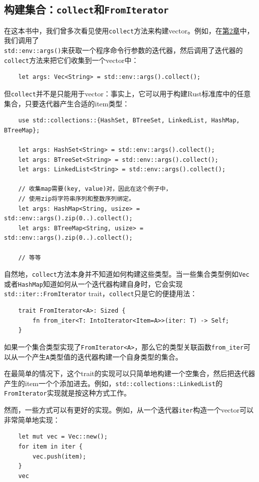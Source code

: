 \subsection{构建集合：\texttt{collect}和\texttt{FromIterator}}\label{BuildColl}
在这本书中，我们曾多次看见使用\texttt{collect}方法来构建vector。例如，在\hyperref[ch02]{第2章}中，我们调用了\\
\texttt{std::env::args()}来获取一个程序命令行参数的迭代器，然后调用了迭代器的\texttt{collect}方法来把它们收集到一个vector中：
\begin{verbatim}
    let args: Vec<String> = std::env::args().collect();
\end{verbatim}

但\texttt{collect}并不是只能用于vector：事实上，它可以用于构建Rust标准库中的任意集合，只要迭代器产生合适的item类型：
\begin{verbatim}
    use std::collections::{HashSet, BTreeSet, LinkedList, HashMap, BTreeMap};

    let args: HashSet<String> = std::env::args().collect();
    let args: BTreeSet<String> = std::env::args().collect();
    let args: LinkedList<String> = std::env::args().collect();

    // 收集map需要(key, value)对，因此在这个例子中，
    // 使用zip将字符串序列和整数序列绑定。
    let args: HashMap<String, usize> = std::env::args().zip(0..).collect();
    let args: BTreeMap<String, usize> = std::env::args().zip(0..).collect();

    // 等等
\end{verbatim}
自然地，\texttt{collect}方法本身并不知道如何构建这些类型。当一些集合类型例如\texttt{Vec}或者\texttt{HashMap}知道如何从一个迭代器构建自身时，它会实现\texttt{std::iter::FromIterator} trait，\texttt{collect}只是它的便捷用法：
\begin{verbatim}
    trait FromIterator<A>: Sized {
        fn from_iter<T: IntoIterator<Item=A>>(iter: T) -> Self;
    }
\end{verbatim}
如果一个集合类型实现了\texttt{FromIterator<A>}，那么它的类型关联函数\texttt{from\_iter}可以从一个产生\texttt{A}类型值的迭代器构建一个自身类型的集合。

在最简单的情况下，这个trait的实现可以只简单地构建一个空集合，然后把迭代器产生的item一个个添加进去。例如，\texttt{std::collections::LinkedList}的\texttt{FromIterator}实现就是按这种方式工作。

然而，一些方式可以有更好的实现。例如，从一个迭代器\texttt{iter}构造一个vector可以非常简单地实现：
\begin{verbatim}
    let mut vec = Vec::new();
    for item in iter {
        vec.push(item);
    }
    vec
\end{verbatim}

